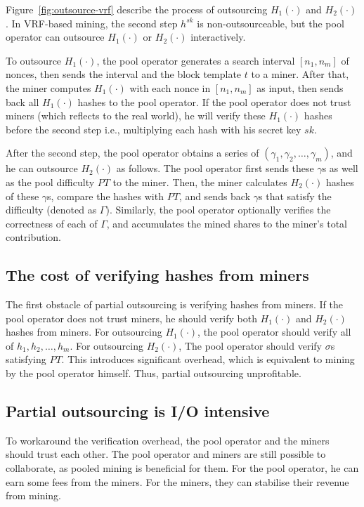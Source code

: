 Figure~\ref{fig:outsource-vrf} describe the process of outsourcing $H_1(\cdot)$ and $H_2(\cdot)$.
In VRF-based mining, the second step $h^{sk}$ is non-outsourceable, but the pool operator can outsource $H_1(\cdot)$ or $H_2(\cdot)$ interactively.

To outsource $H_1(\cdot)$, the pool operator generates a search interval $[n_1, n_m]$ of nonces, then sends the interval and the block template $t$ to a miner.
After that, the miner computes $H_1(\cdot)$ with each nonce in $[n_1, n_m]$ as input, then sends back all $H_1(\cdot)$ hashes to the pool operator.
If the pool operator does not trust miners (which reflects to the real world), he will verify these $H_1(\cdot)$ hashes before the second step i.e., multiplying each hash with his secret key $sk$.

After the second step, the pool operator obtains a series of $(\gamma_1, \gamma_2, \dots, \gamma_m)$, and he can outsource $H_2(\cdot)$ as follows.
The pool operator first sends these $\gamma$s as well as the pool difficulty $PT$ to the miner.
Then, the miner calculates $H_2(\cdot)$ hashes of these $\gamma$s, compare the hashes with $PT$, and sends back $\gamma$s that satisfy the difficulty (denoted as $\Gamma$).
Similarly, the pool operator optionally verifies the correctness of each of $\Gamma$, and accumulates the mined shares to the miner's total contribution.


\subsection{The cost of verifying hashes from miners}

The first obstacle of partial outsourcing is verifying hashes from miners.
If the pool operator does not trust miners, he should verify both $H_1(\cdot)$ and $H_2(\cdot)$ hashes from miners.
For outsourcing $H_1(\cdot)$, the pool operator should verify all of $h_1, h_2, \dots, h_m$.
For outsourcing $H_2(\cdot)$, The pool operator should verify $\sigma$s satisfying $PT$.
This introduces significant overhead, which is equivalent to mining by the pool operator himself.
Thus, partial outsourcing unprofitable.


\subsection{Partial outsourcing is I/O intensive}

To workaround the verification overhead, the pool operator and the miners should trust each other.
The pool operator and miners are still possible to collaborate, as pooled mining is beneficial for them.
For the pool operator, he can earn some fees from the miners.
For the miners, they can stabilise their revenue from mining.

